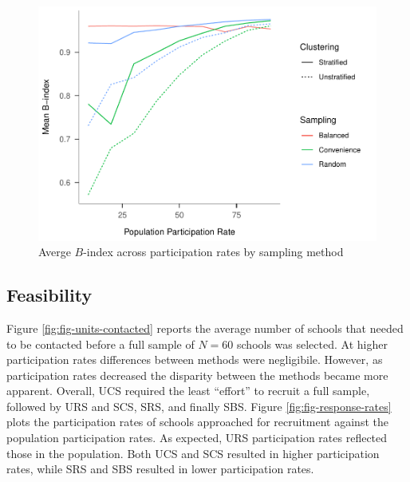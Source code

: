 \documentclass[man,floatsintext]{apa6}
\begin{document}
\begin{figure}
\centering
\includegraphics{GenSamp_Results_files/figure-latex/fig-avg-Bindex-1.pdf}
\caption{\label{fig:fig-avg-Bindex}Averge \(B\)-index across participation rates by sampling method}
\end{figure}

\hypertarget{feasibility}{%
\subsection{Feasibility}\label{feasibility}}

Figure \ref{fig:fig-units-contacted} reports the average number of schools that needed to be contacted before a full sample of \(N = 60\) schools was selected. At higher participation rates differences between methods were negligibile. However, as participation rates decreased the disparity between the methods became more apparent. Overall, UCS required the least \enquote{effort} to recruit a full sample, followed by URS and SCS, SRS, and finally SBS. Figure \ref{fig:fig-response-rates} plots the participation rates of schools approached for recruitment against the population participation rates. As expected, URS participation rates reflected those in the population. Both UCS and SCS resulted in higher participation rates, while SRS and SBS resulted in lower participation rates.
\end{document}
